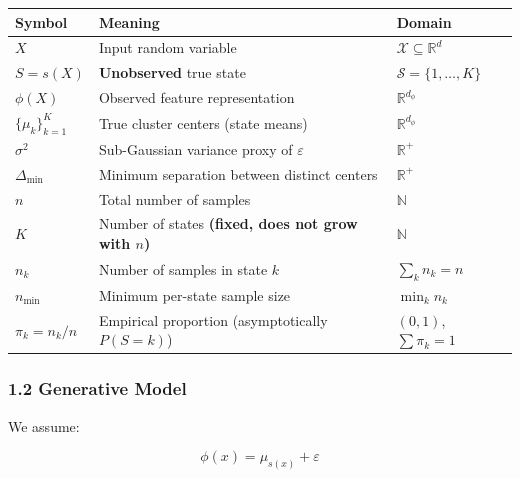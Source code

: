 \documentclass[
  12pt,
]{ctexart}
\begin{document}
\begin{longtable}[]{@{}
  >{\raggedright\arraybackslash}p{}
  >{\raggedright\arraybackslash}p{}
  >{\raggedright\arraybackslash}p{}@{}}
\toprule\noalign{}
\begin{minipage}[b]{\linewidth}\raggedright
Symbol
\end{minipage} & \begin{minipage}[b]{\linewidth}\raggedright
Meaning
\end{minipage} & \begin{minipage}[b]{\linewidth}\raggedright
Domain
\end{minipage} \\
\midrule\noalign{}
\endhead
\bottomrule\noalign{}
\endlastfoot
\(X\) & Input random variable &
\(\mathcal{X} \subseteq \mathbb{R}^d\) \\
\(S = s(X)\) & \textbf{Unobserved} true state &
\(\mathcal{S} = \{1, \dots, K\}\) \\
\(\phi(X)\) & Observed feature representation &
\(\mathbb{R}^{d_\phi}\) \\
\(\{\mu_k\}_{k=1}^K\) & True cluster centers (state means) &
\(\mathbb{R}^{d_\phi}\) \\
\(\sigma^2\) & Sub-Gaussian variance proxy of \(\varepsilon\) &
\(\mathbb{R}^+\) \\
\(\Delta_{\min}\) & Minimum separation between distinct centers &
\(\mathbb{R}^+\) \\
\(n\) & Total number of samples & \(\mathbb{N}\) \\
\(K\) & Number of states \textbf{(fixed, does not grow with \(n\))} &
\(\mathbb{N}\) \\
\(n_k\) & Number of samples in state \(k\) & \(\sum_k n_k = n\) \\
\(n_{\min}\) & Minimum per-state sample size & \(\min_k n_k\) \\
\(\pi_k = n_k/n\) & Empirical proportion (asymptotically \(P(S=k)\)) &
\((0,1)\), \(\sum \pi_k = 1\) \\
\end{longtable}

\subsubsection{1.2 Generative Model}\label{generative-model}

We assume:

\[\phi(x) = \mu_{s(x)} + \varepsilon\]
\end{document}
